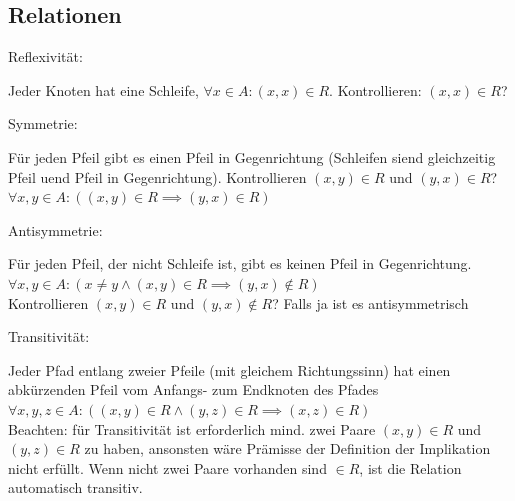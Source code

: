 \documentclass[8pt,landscape]{scrartcl}
\begin{document}
\begin{multicols}{3}
\section{Relationen}

\begin{bf}Reflexivit\"at:\end{bf} Jeder Knoten hat eine Schleife, $\forall x \in A: (x, x) \in R$.
Kontrollieren: $(x, x) \in R$?\\
\begin{bf}Symmetrie:\end{bf} F\"ur jeden Pfeil gibt es einen Pfeil in Gegenrichtung (Schleifen siend gleichzeitig Pfeil uend Pfeil in Gegenrichtung).
Kontrollieren $(x, y) \in R$ und $(y, x) \in R$?\\
$\forall x, y \in A : \left( (x, y) \in R \implies (y, x) \in R \right)$\\ 
\begin{bf}Antisymmetrie:\end{bf} F\"ur jeden Pfeil, der nicht Schleife ist, gibt es keinen Pfeil in Gegenrichtung.\\
$\forall x, y \in A : \left( x \neq y \land (x, y) \in R \implies (y, x) \not\in R \right)$\\ 
Kontrollieren $(x, y) \in R$ und $(y, x) \not\in R$? Falls ja ist es antisymmetrisch\\
\begin{bf}Transitivit\"at:\end{bf} Jeder Pfad entlang zweier Pfeile (mit gleichem Richtungssinn) hat einen abk\"urzenden Pfeil vom Anfangs- zum Endknoten des Pfades\\
$\forall x, y, z \in A: \left( (x, y) \in R \land (y, z) \in R \implies (x, z) \in R \right)$\\
Beachten: f\"ur Transitivit\"at ist erforderlich mind. zwei Paare $(x, y) \in R$ und $(y, z) \in R$ zu haben, ansonsten w\"are Pr\"amisse der Definition der Implikation nicht erf\"ullt.
Wenn nicht zwei Paare vorhanden sind $\in R$, ist die Relation automatisch transitiv.



\end{multicols}
\end{document}
